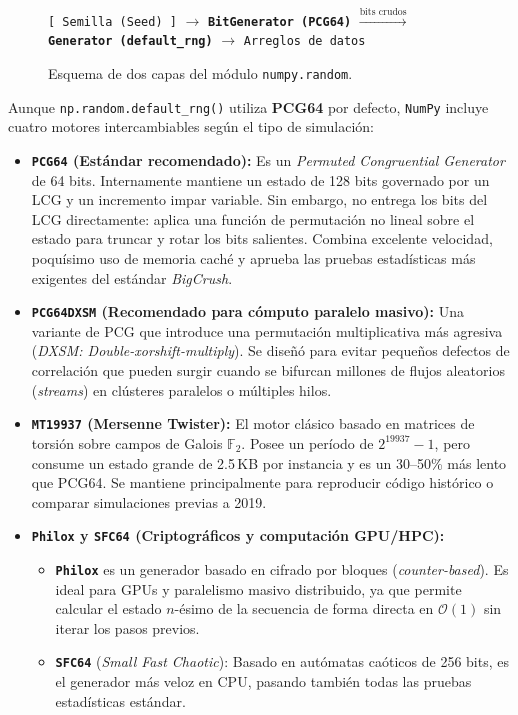 \documentclass[12pt]{article}
\begin{document}
\begin{figure}[htbp]
\centering
\texttt{[ Semilla (Seed) ]} $\longrightarrow$ \textbf{\texttt{BitGenerator (PCG64)}} $\xrightarrow{\text{bits crudos}}$ \textbf{\texttt{Generator (default\_rng)}} $\longrightarrow$ \texttt{Arreglos de datos}
\caption{Esquema de dos capas del módulo \texttt{numpy.random}.}
\label{fig:numpy_random_arch}
\end{figure}

Aunque \texttt{np.random.default\_rng()} utiliza \textbf{PCG64} por defecto, \texttt{NumPy} incluye cuatro motores intercambiables según el tipo de simulación:

\begin{itemize}
    \item \textbf{\texttt{PCG64} (Estándar recomendado):} 
    Es un \textit{Permuted Congruential Generator} de 64 bits. Internamente mantiene un estado de 128 bits governado por un LCG y un incremento impar variable. Sin embargo, no entrega los bits del LCG directamente: aplica una función de permutación no lineal sobre el estado para truncar y rotar los bits salientes. Combina excelente velocidad, poquísimo uso de memoria caché y aprueba las pruebas estadísticas más exigentes del estándar \textit{BigCrush}.
    
    \item \textbf{\texttt{PCG64DXSM} (Recomendado para cómputo paralelo masivo):} 
    Una variante de PCG que introduce una permutación multiplicativa más agresiva (\textit{DXSM: Double-xorshift-multiply}). Se diseñó para evitar pequeños defectos de correlación que pueden surgir cuando se bifurcan millones de flujos aleatorios (\textit{streams}) en clústeres paralelos o múltiples hilos.
    
    \item \textbf{\texttt{MT19937} (Mersenne Twister):} 
    El motor clásico basado en matrices de torsión sobre campos de Galois $\mathbb{F}_2$. Posee un período de $2^{19937} - 1$, pero consume un estado grande de 2.5\,KB por instancia y es un 30--50\% más lento que PCG64. Se mantiene principalmente para reproducir código histórico o comparar simulaciones previas a 2019.
    
    \item \textbf{\texttt{Philox} y \texttt{SFC64} (Criptográficos y computación GPU/HPC):}
    \begin{itemize}
        \item \textbf{\texttt{Philox}} es un generador basado en cifrado por bloques (\textit{counter-based}). Es ideal para GPUs y paralelismo masivo distribuido, ya que permite calcular el estado $n$-ésimo de la secuencia de forma directa en $\mathcal{O}(1)$ sin iterar los pasos previos.
        \item \textbf{\texttt{SFC64}} (\textit{Small Fast Chaotic}): Basado en autómatas caóticos de 256 bits, es el generador más veloz en CPU, pasando también todas las pruebas estadísticas estándar.
    \end{itemize}
\end{itemize}
\end{document}
